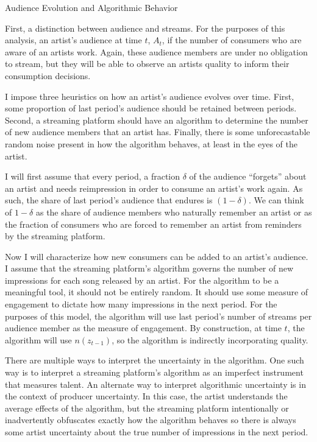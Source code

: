 \documentclass[
]{article}
\begin{document}
Audience Evolution and Algorithmic Behavior

First, a distinction between audience and streams. For the purposes of
this analysis, an artist's audience at time \(t\), \(A_t\), if the
number of consumers who are aware of an artists work. Again, these
audience members are under no obligation to stream, but they will be
able to observe an artists quality to inform their consumption
decisions.

I impose three heuristics on how an artist's audience evolves over time.
First, some proportion of last period's audience should be retained
between periods. Second, a streaming platform should have an algorithm
to determine the number of new audience members that an artist has.
Finally, there is some unforecastable random noise present in how the
algorithm behaves, at least in the eyes of the artist.

I will first assume that every period, a fraction \(\delta\) of the
audience ``forgets'' about an artist and needs reimpression in order to
consume an artist's work again. As such, the share of last period's
audience that endures is \((1-\delta)\). We can think of \(1-\delta\) as
the share of audience members who naturally remember an artist or as the
fraction of consumers who are forced to remember an artist from
reminders by the streaming platform.

Now I will characterize how new consumers can be added to an artist's
audience. I assume that the streaming platform's algorithm governs the
number of new impressions for each song released by an artist. For the
algorithm to be a meaningful tool, it should not be entirely random. It
should use some measure of engagement to dictate how many impressions in
the next period. For the purposes of this model, the algorithm will use
last period's number of streams per audience member as the measure of
engagement. By construction, at time \(t\), the algorithm will use
\(n(z_{t-1})\), so the algorithm is indirectly incorporating quality.

There are multiple ways to interpret the uncertainty in the algorithm.
One such way is to interpret a streaming platform's algorithm as an
imperfect instrument that measures talent. An alternate way to interpret
algorithmic uncertainty is in the context of producer uncertainty. In
this case, the artist understands the average effects of the algorithm,
but the streaming platform intentionally or inadvertently obfuscates
exactly how the algorithm behaves so there is always some artist
uncertainty about the true number of impressions in the next period.
\end{document}
